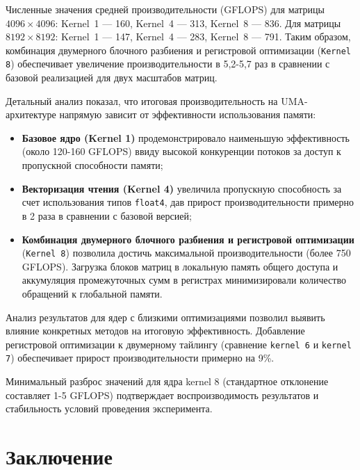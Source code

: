 \documentclass[a4paper]{article}
\begin{document}
Численные значения средней производительности (GFLOPS) для матрицы \(4096 \times 4096\): Kernel~1 --- 160, Kernel~4 --- 313, Kernel~8 --- 836. Для матрицы \(8192 \times 8192\): Kernel~1 --- 147, Kernel~4 --- 283, Kernel~8 --- 791. Таким образом, комбинация двумерного блочного разбиения и регистровой оптимизации (\texttt{Kernel 8}) обеспечивает увеличение производительности в 5,2-5,7 раз в сравнении с базовой реализацией для двух масштабов матриц.

Детальный анализ показал, что итоговая производительность на UMA-архитектуре напрямую зависит от эффективности использования памяти:

\begin{itemize}
    \item \textbf{Базовое ядро (Kernel 1)} продемонстрировало наименьшую эффективность (около 120-160 GFLOPS) ввиду высокой конкуренции потоков за доступ к пропускной способности памяти;
    \item \textbf{Векторизация чтения (Kernel 4)} увеличила пропускную способность за счет использования типов \texttt{float4}, дав прирост производительности примерно в 2 раза в сравнении с базовой версией;
    \item \textbf{Комбинация двумерного блочного разбиения и регистровой оптимизации} (\texttt{Kernel 8}) позволила достичь максимальной производительности (более 750 GFLOPS). Загрузка блоков матриц в локальную память общего доступа и аккумуляция промежуточных сумм в регистрах минимизировали количество обращений к глобальной памяти.
\end{itemize}

Анализ результатов для ядер с близкими оптимизациями позволил выявить влияние конкретных методов на итоговую эффективность. Добавление регистровой оптимизации к двумерному тайлингу (сравнение \texttt{kernel 6} и \texttt{kernel 7}) обеспечивает прирост производительности примерно на 9\%.

Минимальный разброс значений для ядра kernel 8 (стандартное отклонение составляет 1-5 GFLOPS) подтверждает воспроизводимость результатов и стабильность условий проведения эксперимента.

\section{Заключение}
\end{document}
